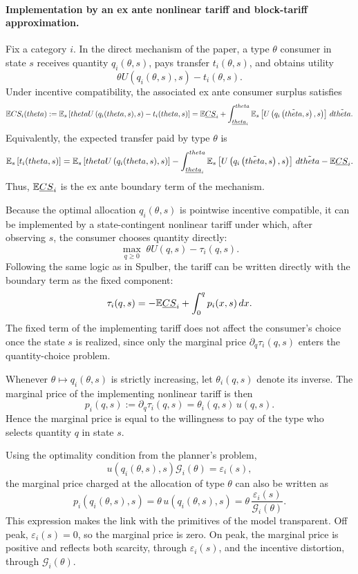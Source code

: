 \documentclass{class}
\begin{document}
\paragraph{Implementation by an ex ante nonlinear tariff and block-tariff approximation.}
Fix a category \(i\). In the direct mechanism of the paper, a type \(\theta\) consumer in state \(s\) receives quantity \(q_i(\theta,s)\), pays transfer \(t_i(\theta,s)\), and obtains utility
\[
\theta U\left(q_i(\theta,s),s\right)-t_i(\theta,s).
\]
Under incentive compatibility, the associated ex ante consumer surplus satisfies
\[
\mathbb{E} CS_i(theta)
:=
\mathbb{E}_s\left[theta U\left(q_i(theta,s),s\right)-t_i(theta,s)\right]
=
\mathbb{E}\underline{CS}_i
+
\int_{\underline{theta}_i}^{theta}
\mathbb{E}_s\left[U\left(q_i\left(\tilde{theta},s\right),s\right)\right]\,d\tilde{theta}.
\]
Equivalently, the expected transfer paid by type \(\theta\) is
\[
\mathbb{E}_s\left[t_i(theta,s)\right]
=
\mathbb{E}_s\left[theta U\left(q_i(theta,s),s\right)\right]
-
\int_{\underline{theta}_i}^{theta}
\mathbb{E}_s\left[U\left(q_i\left(\tilde{theta},s\right),s\right)\right]\,d\tilde{theta}
-
\mathbb{E}\underline{CS}_i.
\]
Thus, \(\mathbb{E}\underline{CS}_i\) is the ex ante boundary term of the mechanism.

Because the optimal allocation \(q_i(\theta,s)\) is pointwise incentive compatible, it can be implemented by a state-contingent nonlinear tariff under which, after observing \(s\), the consumer chooses quantity directly:
\[
\max_{q\geq 0}\;\theta U(q,s)-\tau_i(q,s).
\]
Following the same logic as in Spulber, the tariff can be written directly with the boundary term as the fixed component:
\[
\tau_i(q,s)
=
-\mathbb{E}\underline{CS}_i
+
\int_0^q p_i(x,s)\,dx.
\]
The fixed term of the implementing tariff does not affect the consumer's choice once the state \(s\) is realized, since only the marginal price \(\partial_q\tau_i(q,s)\) enters the quantity-choice problem. 

Whenever \(\theta\mapsto q_i(\theta,s)\) is strictly increasing, let \(\theta_i(q,s)\) denote its inverse. The marginal price of the implementing nonlinear tariff is then
\[
p_i(q,s):=\partial_q\tau_i(q,s)=\theta_i(q,s)\,u(q,s).
\]
Hence the marginal price is equal to the willingness to pay of the type who selects quantity \(q\) in state \(s\).

Using the optimality condition from the planner's problem,
\[
u\left(q_i(\theta,s),s\right)\mathcal{G}_i(\theta)=\varepsilon_i(s),
\]
the marginal price charged at the allocation of type \(\theta\) can also be written as
\[
p_i\left(q_i(\theta,s),s\right)
=
\theta\,u\left(q_i(\theta,s),s\right)
=
\theta\,\frac{\varepsilon_i(s)}{\mathcal{G}_i(\theta)}.
\]
This expression makes the link with the primitives of the model transparent. Off peak, \(\varepsilon_i(s)=0\), so the marginal price is zero. On peak, the marginal price is positive and reflects both scarcity, through \(\varepsilon_i(s)\), and the incentive distortion, through \(\mathcal{G}_i(\theta)\).
\end{document}

